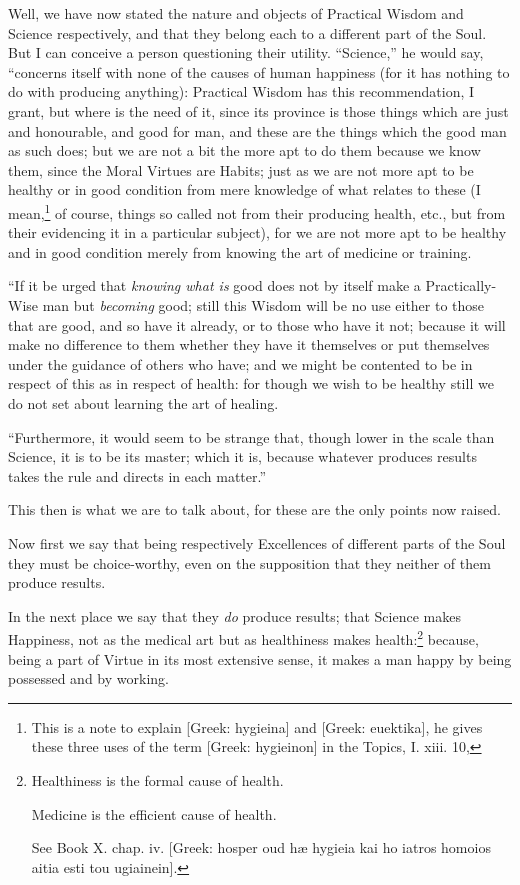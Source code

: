 Well, we have now stated the nature and objects of Practical Wisdom and Science
respectively, and that they belong each to a different part of the Soul. But I
can conceive a person questioning their utility. “Science,” he
would say, “concerns itself with none of the causes of human happiness
(for it has nothing to do with producing anything): Practical Wisdom has this
recommendation, I grant, but where is the need of it, since its province is
those things which are just and honourable, and good for man, and these are the
things which the good man as such does; but we are not a bit the more apt to do
them because we know them, since the Moral Virtues are Habits; just as we are
not more apt to be healthy or in good condition from mere knowledge of what
relates to these (I mean,\footnote{This is a note to explain [Greek: hygieina] and [Greek: euektika], he gives
these three uses of the term [Greek: hygieinon] in the Topics, I. xiii. 10,}
of course, things so called not from their producing health, etc., but from
their evidencing it in a particular subject), for we are not more apt to be
healthy and in good condition merely from knowing the art of medicine or
training.

“If it be urged that \emph{knowing what is} good does not by itself make
a Practically-Wise man but \emph{becoming} good; still this Wisdom will be no
use either to those that are good, and so have it already, or to those who have
it not; because it will make no difference to them whether they have it
themselves or put themselves under the guidance of others who have; and we
might be contented to be in respect of this as in respect of health: for though
we wish to be healthy still we do not set about learning the art of healing.

“Furthermore, it would seem to be strange that, though lower in the scale
than Science, it is to be its master; which it is, because whatever produces
results takes the rule and directs in each matter.”

This then is what we are to talk about, for these are the only points now
raised.

Now first we say that being respectively Excellences of different parts of the
Soul they must be choice-worthy, even on the supposition that they neither of
them produce results.

In the next place we say that they \emph{do} produce results; that Science
makes Happiness, not as the medical art but as healthiness makes
health:\footnote{Healthiness is the formal cause of health.

Medicine is the efficient cause of health.

See Book X. chap. iv. [Greek: hosper oud hæ hygieia kai ho iatros homoios
aitia esti tou ugiainein].}
because, being a part of Virtue in its most extensive sense, it makes a man
happy by being possessed and by working.

